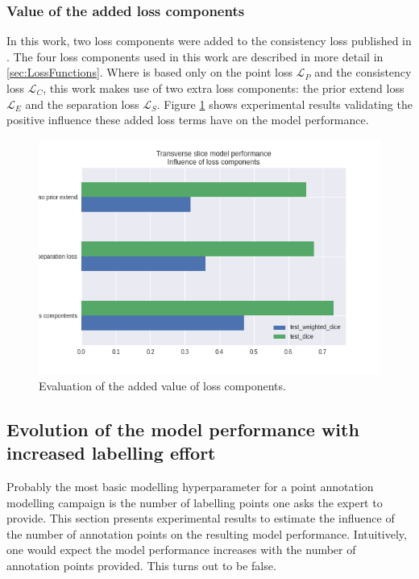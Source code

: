 \subsubsection{Value of the added loss components}
\par{
    In this work, two loss components were added to the consistency loss published in \cite{Laradji}.
    The four loss components used in this work are described in more detail in \ref{sec:LossFunctions}.
    Where \cite{Laradji} is based only on the point loss $\mathcal{L}_P$ and the consistency loss $\mathcal{L}_C$, this work makes use of two extra loss components:
    the prior extend loss $\mathcal{L}_E$ and the separation loss $\mathcal{L}_S$.
    Figure \ref{fig:addedLossComponents} shows experimental results validating the positive influence these added loss terms have on the model performance.
}


\begin{figure}
    \centering
    \includegraphics[width=.95\textwidth]{images/TransverseModel_Losscomponents.png}
    \caption{Evaluation of the added value of loss components. \label{fig:addedLossComponents}}
\end{figure}

\subsection{Evolution of the model performance with increased labelling effort}
\par{
    Probably the most basic modelling hyperparameter for a point annotation modelling campaign is the number of labelling points one asks the expert to provide.
    This section presents experimental results to estimate the influence of the number of annotation points on the resulting model performance.
    Intuitively, one would expect the model performance increases with the number of annotation points provided.
    This turns out to be false.
}
